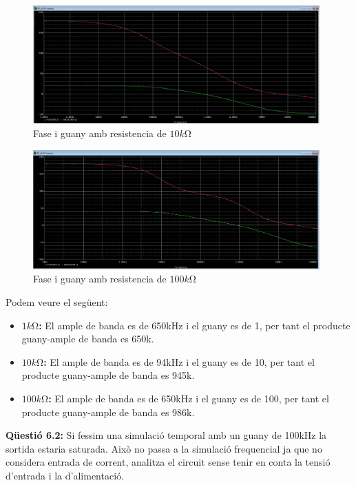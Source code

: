 \documentclass[12pt, a4papre]{article}
\begin{document}
	\begin{figure}[H]
		\begin{center}
		\includegraphics[width=110mm]{6_1_10.PNG}
		\caption{Fase i guany amb resistencia de $10k\si{\ohm}$}
		\end{center}
	\end{figure}
	
	\begin{figure}[H]
		\begin{center}
		\includegraphics[width=110mm]{6_1_100.PNG}
		\caption{Fase i guany amb resistencia de $100k\si{\ohm}$}
		\end{center}
	\end{figure}
	
	Podem veure el següent:
	\begin{itemize}
		\item \textbf{$1k\si{\ohm}$:} El ample de banda es de 650kHz i el guany es de 1, per tant el producte guany-ample de banda es 650k.
		\item \textbf{$10k\si{\ohm}$:} El ample de banda es de 94kHz i el guany es de 10, per tant el producte guany-ample de banda es 945k.
		\item \textbf{$100k\si{\ohm}$:} El ample de banda es de 650kHz i el guany es de 100, per tant el producte guany-ample de banda es 986k.
	\end{itemize}
	
	\textbf{Qüestió 6.2:} Si fessim una simulació temporal amb un guany de 100kHz la sortida estaria saturada. Això no passa a la simulació frequencial ja que no considera entrada de corrent, analitza el circuit sense tenir en conta la tensió d'entrada i la d'alimentació.
	
\end{document}

